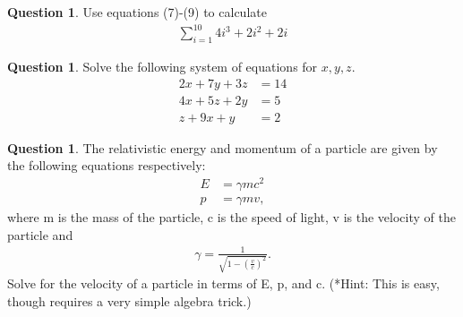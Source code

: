 \documentclass[12pt]{article}
\theoremstyle{definition}
\newtheorem{question}[thm]{Question}
\begin{document}
\vspace{3cm}

\begin{question}
	Use equations (7)-(9) to calculate 
	\begin{align}
	\sum_{i=1}^{10}4i^3+2i^2+2i
	\end{align}
\end{question}

\vspace{4cm}


\begin{question}
Solve the following system of equations for $x,y,z$.
\begin{align}
2x+7y+3z&=14 \\
4x+5z+2y&=5 \\
z+9x+y&=2
\end{align}
\end{question}

\vspace{3cm}

\begin{question}
	The relativistic energy and momentum of a particle are given by the following equations
	respectively:
	\begin{align}
	E&=\gamma mc^2 \\
	p&=\gamma mv,
	\end{align}
	where m is the mass of the particle, c is the speed of light, v is the velocity of the particle and
	\begin{align}
	\gamma = \frac{1}{\sqrt{1-\left(\frac{v}{c}\right)^2}}.
	\end{align}
	Solve for the velocity of a particle in terms of E, p, and c. (*Hint: This is easy, though requires a very
	simple algebra trick.)
\end{question}


\end{document}

